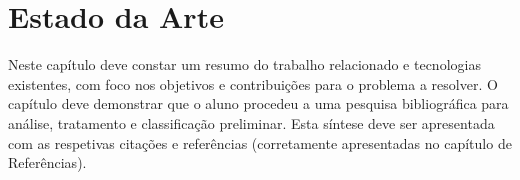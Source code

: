 \chapter{Estado da Arte} %
\label{chap:estado_arte}

Neste capítulo deve constar um resumo do trabalho relacionado e tecnologias existentes, com foco nos objetivos e contribuições para o problema a resolver. O capítulo deve demonstrar que o aluno procedeu a uma pesquisa bibliográfica para análise, tratamento e classificação preliminar. Esta síntese deve ser apresentada com as respetivas citações e referências (corretamente apresentadas no capítulo de Referências).




